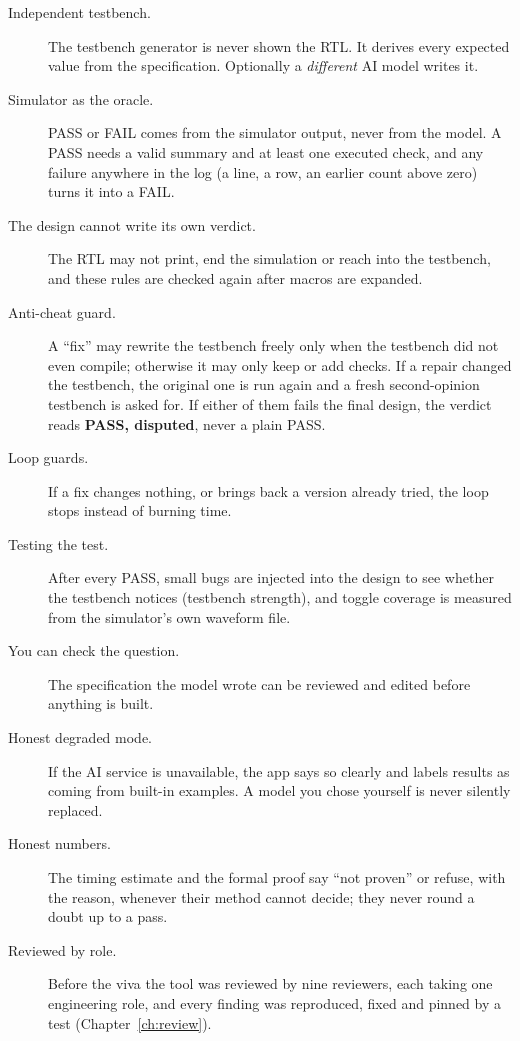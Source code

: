 \begin{description}
  \item[Independent testbench.] The testbench generator is never shown the RTL. It derives every expected value from the specification. Optionally a \emph{different} AI model writes it.
  \item[Simulator as the oracle.] PASS or FAIL comes from the simulator output, never from the model. A PASS needs a valid summary and at least one executed check, and any failure anywhere in the log (a  line, a  row, an earlier  count above zero) turns it into a FAIL.
  \item[The design cannot write its own verdict.] The RTL may not print, end the simulation or reach into the testbench, and these rules are checked again after macros are expanded.
  \item[Anti-cheat guard.] A ``fix'' may rewrite the testbench freely only when the testbench did not even compile; otherwise it may only keep or add checks. If a repair changed the testbench, the original one is run again and a fresh second-opinion testbench is asked for. If either of them fails the final design, the verdict reads \textbf{PASS, disputed}, never a plain PASS.
  \item[Loop guards.] If a fix changes nothing, or brings back a version already tried, the loop stops instead of burning time.
  \item[Testing the test.] After every PASS, small bugs are injected into the design to see whether the testbench notices (testbench strength), and toggle coverage is measured from the simulator's own waveform file.
  \item[You can check the question.] The specification the model wrote can be reviewed and edited before anything is built.
  \item[Honest degraded mode.] If the AI service is unavailable, the app says so clearly and labels results as coming from built-in examples. A model you chose yourself is never silently replaced.
  \item[Honest numbers.] The timing estimate and the formal proof say ``not proven'' or refuse, with the reason, whenever their method cannot decide; they never round a doubt up to a pass.
  \item[Reviewed by role.] Before the viva the tool was reviewed by nine reviewers, each taking one engineering role, and every finding was reproduced, fixed and pinned by a test (Chapter~\ref{ch:review}).
\end{description}

